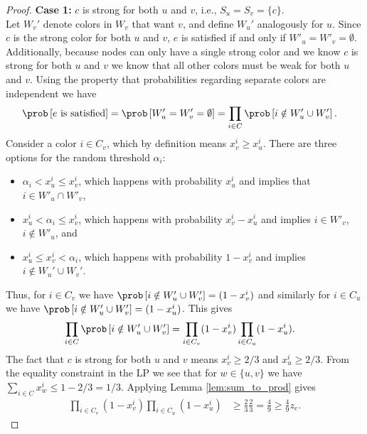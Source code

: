 \begin{proof}
	\noindent
	\textbf{Case 1:} $c$ is strong for both $u$ and $v$, i.e., $S_u = S_v = \{c\}$.\\
	Let $W_v'$ denote colors in $W_v$ that want $v$, and define $W_u'$ analogously for $u$.
	Since $c$ is the strong color for both $u$ and $v$, $e$ is satisfied if and only if $W'_u = W'_v = \emptyset$. Additionally, because nodes can only have a single strong color and we know $c$ is strong for both $u$ and $v$ we know that all other colors must be weak for both $u$ and $v$. Using the property that probabilities regarding separate colors are independent we have
	\begin{align*}
		\prob\left[e \text{ is satisfied}\right] & = \prob\left[W'_u = W'_v = \emptyset\right]  = \prod_{i \in C}\prob\left[ i \notin W'_u \cup W'_v \right].
	\end{align*}
	Consider a color $i \in C_v$, which by definition means $x_v^i \geq x_u^i$. There are three options for the random threshold $\alpha_i$:
	\begin{itemize}
		\item $\alpha_i < x_u^i \leq x_v^i$, which happens with probability $x_u^i$ and implies that $i \in W'_u \cap W'_v$,
		\item $x_u^i < \alpha_i \leq x_v^i$, which happens with probability $x_v^i - x_u^i$ and implies $i \in W'_v$, $i \notin W'_u$, and
		\item $x_u^i \leq x_v^i < \alpha_i$, which happens with probability $1 - x_v^i$ and implies $i \notin W_u' \cup W_v'$.
	\end{itemize}
	Thus, for $i \in C_v$ we have $\prob\left[i \notin W'_u \cup W'_v\right] = (1 - x_v^i)$ and similarly for $i \in C_u$ we have $\prob\left[i \notin W'_u \cup W'_v\right] = (1 - x_u^i)$. This gives
	\begin{align*}
		\prod_{i \in C}\prob\left[ i \notin W'_u \cup W'_v \right] & = \prod_{i \in C_v}(1 - x_v^i)\prod_{i \in C_u}(1 - x_u^i).
	\end{align*}
	The fact that $c$ is strong for both $u$ and $v$ means $x_v^i \geq 2/3$ and $x_u^i \geq 2/3$. From the equality constraint in the LP we see that for $w\in\{u,v\}$ we have $\sum_{i \in C}x_w^i \leq 1 - 2/3 = 1/3$. Applying Lemma \ref{lem:sum_to_prod} gives
	\begin{align*}
		\prod_{i \in C_v}(1 - x_v^i)\prod_{i \in C_u}(1 - x_u^i) & \geq \frac{2}{3}\frac{2}{3} = \frac{4}{9} \geq \frac{4}{9}z_e.
	\end{align*}



\end{proof}
